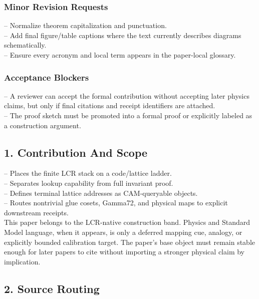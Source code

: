 \documentclass[11pt]{article}
\begin{document}
\subsubsection*{Minor Revision Requests}

\noindent{}-- Normalize theorem capitalization and punctuation.\\
\noindent{}-- Add final figure/table captions where the text currently describes diagrams schematically.\\
\noindent{}-- Ensure every acronym and local term appears in the paper-local glossary.\\

\subsubsection*{Acceptance Blockers}

\noindent{}-- A reviewer can accept the formal contribution without accepting later physics claims, but only if final citations and receipt identifiers are attached.\\
\noindent{}-- The proof sketch must be promoted into a formal proof or explicitly labeled as a construction argument.\\


\subsection*{1. Contribution And Scope}

\noindent{}-- Places the finite LCR stack on a code/lattice ladder.\\
\noindent{}-- Separates lookup capability from full invariant proof.\\
\noindent{}-- Defines terminal lattice addresses as CAM-queryable objects.\\
\noindent{}-- Routes nontrivial glue cosets, Gamma72, and physical maps to explicit downstream receipts.\\

This paper belongs to the LCR-native construction band. Physics and Standard Model language, when it appears, is only a deferred mapping cue, analogy, or explicitly bounded calibration target. The paper's base object must remain stable enough for later papers to cite without importing a stronger physical claim by implication.

\subsection*{2. Source Routing}
\end{document}
